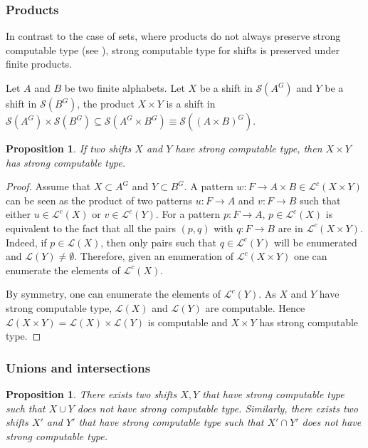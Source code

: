 \documentclass[french,american]{article}
\theoremstyle{plain}
\newtheorem{proposition}[theorem]{Proposition}
\theoremstyle{definition}
\theoremstyle{remark}
\theoremstyle{plain}
\begin{document}
\subsubsection{Products}

In contrast to the case of sets, where products do not always preserve strong computable type (see \cite{AMIR2024109020}),
strong computable type for shifts is preserved under finite products. 

Let $A$ and $B$ be two finite alphabets. Let $X$ be a shift in
$\mathcal{S}(A^{G})$ and $Y$ be a shift in $\mathcal{S}(B^{G})$,
the product $X\times Y$ is a shift in $\mathcal{S}(A^{G})\times\mathcal{S}(B^{G})\subseteq\mathcal{S}(A^{G}\times B^{G})\equiv\mathcal{S}((A\times B)^{G})$.
\begin{proposition}
If two shifts $X$ and $Y$ have strong computable type, then $X\times Y$
has strong computable type.
\end{proposition}

\begin{proof}
Assume that $X \subset A^G$ and $Y\subset B^G$. A pattern $w : F\to A\times B \in \mathcal{L}^{c}(X\times Y)$ can be seen as the product of two patterns $u: F\to A$ and $v: F\to B$ such that either $u\in\mathcal{L}^{c}(X)$ or $v\in\mathcal{L}^{c}(Y)$.
For a pattern $p : F\to A$, $p\in\mathcal{L}^{c}(X)$ is equivalent to the fact that all the pairs $(p,q)$ with $q : F\to B$ are in $\mathcal{L}^{c}(X\times Y)$. Indeed, if $p\in\mathcal{L}(X)$, then only pairs such that $q\in \mathcal{L}^{c}(Y)$ will be enumerated and $\mathcal{L}(Y)\neq\emptyset$.
Therefore, given an enumeration of $\mathcal{L}^{c}(X\times Y)$
one can enumerate the elements of $\mathcal{L}^{c}(X)$.

By symmetry, one can enumerate the elements of $\mathcal{L}^{c}(Y)$.
As $X$ and $Y$ have strong computable type, $\mathcal{L}(X)$ and
$\mathcal{L}(Y)$ are computable. Hence $\mathcal{L}(X\times Y)=\mathcal{L}(X)\times\mathcal{L}(Y)$
is computable and $X\times Y$ has strong computable type.
\end{proof}

\subsubsection{Unions and intersections}
\begin{proposition}
There exists two shifts $X,Y$ that have strong computable type such
that $X\cup Y$ does not have strong computable type. Similarly, there exists two shifts $X'$ and $Y'$ that have strong computable type such
that $X'\cap Y'$ does not have strong computable type.
\end{proposition}
\end{document}
